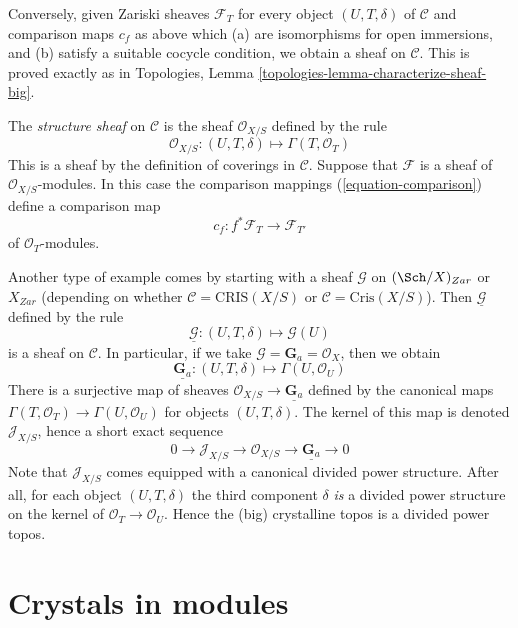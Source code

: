 \medskip\noindent
Conversely, given Zariski sheaves $\mathcal{F}_T$ for every object
$(U, T, \delta)$ of $\mathcal{C}$ and comparison maps
$c_f$ as above which (a) are isomorphisms for open immersions, and (b)
satisfy a suitable cocycle condition, we obtain a sheaf on
$\mathcal{C}$. This is proved exactly as in
Topologies, Lemma \ref{topologies-lemma-characterize-sheaf-big}.

\medskip\noindent
The {\it structure sheaf} on $\mathcal{C}$ is the sheaf
$\mathcal{O}_{X/S}$ defined by the rule
$$
\mathcal{O}_{X/S} :
(U, T, \delta)
\longmapsto
\Gamma(T, \mathcal{O}_T)
$$
This is a sheaf by the definition of coverings in $\mathcal{C}$.
Suppose that $\mathcal{F}$ is a sheaf of $\mathcal{O}_{X/S}$-modules.
In this case the comparison mappings (\ref{equation-comparison})
define a comparison map
\begin{equation}
\label{equation-comparison-modules}
c_f : f^*\mathcal{F}_T \longrightarrow \mathcal{F}_{T'}
\end{equation}
of $\mathcal{O}_T$-modules.

\medskip\noindent
Another type of example comes by starting with a sheaf
$\mathcal{G}$ on $(\Sch/X)_{Zar}$ or $X_{Zar}$ (depending on whether
$\mathcal{C} = \text{CRIS}(X/S)$ or $\mathcal{C} = \text{Cris}(X/S)$).
Then $\underline{\mathcal{G}}$ defined by the rule
$$
\underline{\mathcal{G}} :
(U, T, \delta)
\longmapsto
\mathcal{G}(U)
$$
is a sheaf on $\mathcal{C}$. In particular, if we take
$\mathcal{G} = \mathbf{G}_a = \mathcal{O}_X$, then we obtain
$$
\underline{\mathbf{G}_a} :
(U, T, \delta)
\longmapsto
\Gamma(U, \mathcal{O}_U)
$$
There is a surjective map of sheaves
$\mathcal{O}_{X/S} \to \underline{\mathbf{G}_a}$ defined by the
canonical maps $\Gamma(T, \mathcal{O}_T) \to \Gamma(U, \mathcal{O}_U)$
for objects $(U, T, \delta)$. The kernel of this map is denoted
$\mathcal{J}_{X/S}$, hence a short exact sequence
$$
0 \to
\mathcal{J}_{X/S} \to
\mathcal{O}_{X/S} \to
\underline{\mathbf{G}_a} \to 0
$$
Note that $\mathcal{J}_{X/S}$ comes equipped with a canonical
divided power structure. After all, for each object $(U, T, \delta)$
the third component $\delta$ {\it is} a divided power structure on the
kernel of $\mathcal{O}_T \to \mathcal{O}_U$. Hence the (big)
crystalline topos is a divided power topos.





\section{Crystals in modules}
\label{section-crystals}


